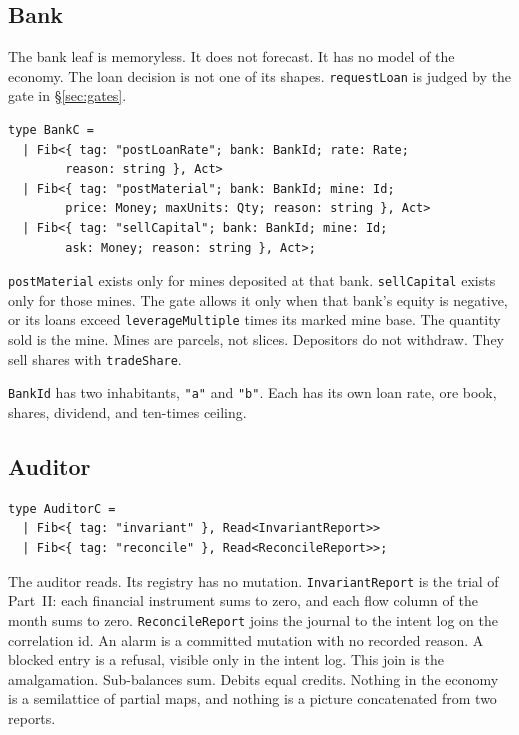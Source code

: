 \documentclass[11pt]{article}
\newenvironment{keep}{\noindent\begin{minipage}{\linewidth}}{\end{minipage}}
\begin{document}
\subsection{Bank}

The bank leaf is memoryless. It does not forecast. It has no model of the
economy. The loan decision is not one of its shapes. \texttt{requestLoan}
is judged by the gate in \S\ref{sec:gates}.

\begin{keep}
\begin{lstlisting}
type BankC =
  | Fib<{ tag: "postLoanRate"; bank: BankId; rate: Rate;
        reason: string }, Act>
  | Fib<{ tag: "postMaterial"; bank: BankId; mine: Id;
        price: Money; maxUnits: Qty; reason: string }, Act>
  | Fib<{ tag: "sellCapital"; bank: BankId; mine: Id;
        ask: Money; reason: string }, Act>;
\end{lstlisting}
\end{keep}

\texttt{postMaterial} exists only for mines deposited at that bank.
\texttt{sellCapital} exists only for those mines. The gate allows it only
when that bank's equity is negative, or its loans exceed
\texttt{leverageMultiple} times its marked mine base.
The quantity sold is the mine. Mines are parcels, not slices.
Depositors do not withdraw. They sell shares with \texttt{tradeShare}.

\texttt{BankId} has two inhabitants, \texttt{"a"} and \texttt{"b"}. Each has
its own loan rate, ore book, shares, dividend, and ten-times ceiling.

\subsection{Auditor}

\begin{keep}
\begin{lstlisting}
type AuditorC =
  | Fib<{ tag: "invariant" }, Read<InvariantReport>>
  | Fib<{ tag: "reconcile" }, Read<ReconcileReport>>;
\end{lstlisting}
\end{keep}

The auditor reads. Its registry has no mutation. \texttt{InvariantReport}
is the trial of Part~II: each financial instrument sums to zero, and each
flow column of the month sums to zero. \texttt{ReconcileReport} joins the
journal to the intent log on the correlation id. An alarm is a committed
mutation with no recorded reason. A blocked entry is a refusal, visible only
in the intent log. This join is the amalgamation. Sub-balances sum. Debits
equal credits. Nothing in the economy is a semilattice of partial maps, and
nothing is a picture concatenated from two reports.
\end{document}
